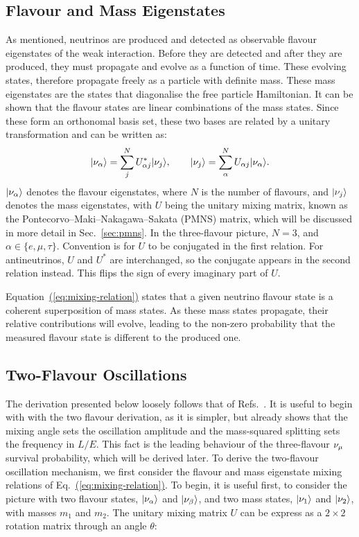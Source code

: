 \subsection{Flavour and Mass Eigenstates}
\label{sec:flavour-mass}
As mentioned, neutrinos are produced and detected as observable flavour eigenstates of the weak interaction. 
Before they are detected and after they are produced, they must propagate and evolve as a function of time. These evolving states, therefore propagate freely as a particle with definite mass. These mass eigenstates are the states that diagonalise the free particle Hamiltonian. It can be shown that the flavour states are linear combinations of the mass states. Since these form an orthonomal basis set, these two bases are related by a unitary transformation and can be written as:
\begin{equation}
    \lvert \nu_\alpha \rangle = \sum^{N}_{j} U^{*}_{\alpha j}\lvert \nu_j \rangle,
    \qquad
    \lvert \nu_j \rangle = \sum^{N}_{\alpha} U_{\alpha j}\lvert \nu_\alpha \rangle.
    \label{eq:mixing-relation}
\end{equation}
$\lvert \nu_\alpha \rangle$ denotes the flavour eigenstates, where $N$ is the number of flavours, and $\lvert \nu_j \rangle$ denotes the mass eigenstates, with $U$ being the unitary mixing matrix, known as the Pontecorvo--Maki--Nakagawa--Sakata (PMNS) matrix, which will be discussed in more detail in Sec.~\ref{sec:pmns}. In the three-flavour picture, $N=3$, and $\alpha \in \{e,\mu,\tau\}$.
Convention is for $U$ to be conjugated in the first relation. For
antineutrinos, $U$ and $U^{*}$ are interchanged, so the conjugate
appears in the second relation instead. This flips the sign of every
imaginary part of $U$.

Equation~\hyperref[eq:mixing-relation]{(\ref{eq:mixing-relation})} states that a given neutrino flavour state is a coherent superposition of mass states. As these mass states propagate, their relative contributions will evolve, leading to the non-zero probability that the measured flavour state is different to the produced one.

\subsection{Two-Flavour Oscillations}
\label{sec:two-flavour}
The derivation presented below loosely follows that of Refs.~\cite{GiuntiKim2007,Booth2021}.
It is useful to begin with with the two flavour derivation, as it is simpler, but already shows that the mixing angle sets the oscillation amplitude and the mass-squared splitting sets the frequency in $L/E$. This fact is the leading behaviour of the three-flavour $\nu_\mu$ survival probability, which will be derived later.
To derive the two-flavour oscillation mechanism, we first consider the flavour and mass eigenstate mixing relations of Eq.~\hyperref[eq:mixing-relation]{(\ref{eq:mixing-relation})}. To begin, it is useful first, to consider the picture with two flavour states, $\lvert \nu_\alpha \rangle$ and $\lvert \nu_\beta \rangle$, and two mass states, $\lvert \nu_1 \rangle$ and $\lvert \nu_2 \rangle$, with masses $m_1$ and $m_2$. The unitary mixing matrix $U$ can be express as a $2\times2$ rotation matrix through an angle $\theta$:

